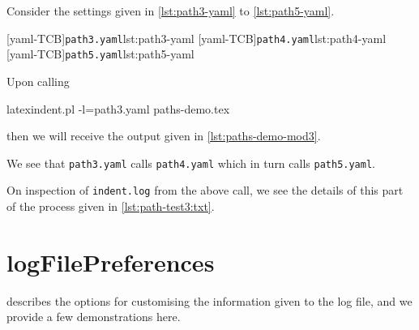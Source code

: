 \documentclass[10pt]{article}
\begin{document}
  \begin{example}
  Consider the settings given in \cref{lst:path3-yaml} to \cref{lst:path5-yaml}.

  \begin{cmhtcbraster}[raster columns=3,
    raster left skip=-3.5cm,
    raster right skip=-2cm,
    raster column skip=.03\linewidth]
   [yaml-TCB]{\texttt{path3.yaml}}{lst:path3-yaml}
   [yaml-TCB]{\texttt{path4.yaml}}{lst:path4-yaml}
   [yaml-TCB]{\texttt{path5.yaml}}{lst:path5-yaml}
  \end{cmhtcbraster}

  Upon calling

  \begin{commandshell}
latexindent.pl -l=path3.yaml paths-demo.tex
\end{commandshell}

  then we will receive the output given in \cref{lst:paths-demo-mod3}.


  We see that \texttt{path3.yaml} calls \texttt{path4.yaml} which in turn calls
  \texttt{path5.yaml}.

  On inspection of \texttt{indent.log} from the above call, we see the details of this
  part of the process given in \cref{lst:path-test3:txt}.

  \end{example}

 \section{logFilePreferences}\label{app:logfile-demo}
   describes the options for customising the information given
  to the log file, and we provide a few demonstrations here.
\end{document}
